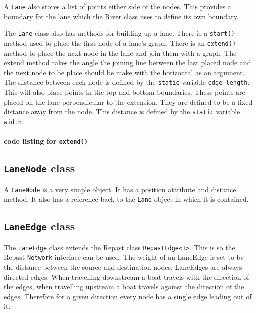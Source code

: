 A \texttt{Lane} also stores a list of points either side of the nodes. This
provides a boundary for the lane which the River class uses to define
its own boundary.

The \texttt{Lane} class also has methods for building up a lane. There is a
\texttt{start()} method used to place the first node of a lane's
graph. There is an \texttt{extend()} method to place the next node in
the lane and join them with a graph. The extend method takes the angle
the joining line between the last placed node and the next node to be
place should be make with the horizontal as an argument. The distance
between each node is defined by the \texttt{static} variable
\texttt{edge\_length}. This will also place points in the top and
bottom boundaries. These points are placed on the lane perpendicular
to the extension. They are defined to be a fixed distance away from
the node. This distance is defined by the \texttt{static} variable
\texttt{width}.

\paragraph{code listing for \texttt{extend()}}



\subsection{\texttt{LaneNode} class}
A \texttt{LaneNode} is a very simple object. It has a position attribute and
distance method. It also has a reference back to the \texttt{Lane} object in
which it is contained.

\subsection{\texttt{LaneEdge} class}
The \texttt{LaneEdge} class extends the Repast class \texttt{RepastEdge<T>}. This is so
the Repast \texttt{Network} interface can be used. The weight of an LaneEdge is
set to be the distance between the source and destination
nodes. LaneEdges are always directed edges. When travelling downstream
a boat travels with the direction of the edges, when travelling
upstream a boat travels against the direction of the edges. Therefore
for a given direction every node has a single edge leading out of it.

